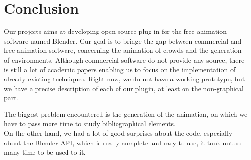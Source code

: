 \section{Conclusion}

Our projects aims at developing open-source plug-in for the free animation software named Blender. Our goal is to bridge the gap between commercial and free animation software, concerning the animation of crowds and the generation of environments. Although commercial software do not provide any source, there is still a lot of academic papers enabling us to focus on the implementation of already-existing techniques. Right now, we do not have a working prototype, but we have a precise description of each of our plugin, at least on the non-graphical part. 

The biggest problem encountered is the generation of the animation, on which we have to pass more time to study bibliographical elements.\\
On the other hand, we had a lot of good surprises about the code, especially about the Blender API, which is really complete and easy to use, it took not so many time to be used to it.
